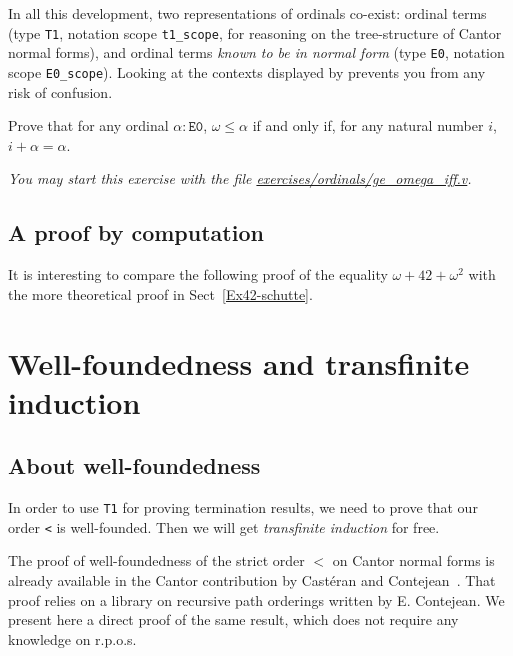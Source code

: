 \begin{remark}
In all this development, two representations of ordinals co-exist: ordinal terms (type \texttt{T1}, notation scope \texttt{t1\_scope}, for reasoning on the tree-structure of Cantor normal forms), and ordinal terms \emph{known to be in normal form} (type \texttt{E0}, notation scope \texttt{E0\_scope}). Looking at the contexts displayed by \coq{} prevents you from any risk of confusion.
\end{remark}

\begin{exercise}
Prove that for any ordinal $\alpha:\texttt{E0}$, 
$\omega\leq \alpha$ if and only if, for any natural number $i$,
$i+\alpha=\alpha$.

\emph{You may start this exercise with the file
    \href{https://github.com/coq-community/hydra-battles/tree/master/exercises/ordinals/ge_omega_iff.v}{exercises/ordinals/ge\_omega\_iff.v}.}
\end{exercise}

\subsection{A proof by computation}
\label{Ex42-E0}

It is interesting to compare the following proof of the equality
$\omega+42+\omega^2$ with the more theoretical proof in Sect~\vref{Ex42-schutte}.


\section{Well-foundedness and transfinite induction}


\subsection{About  well-foundedness}
\label{sec:T1Wf}
\label{sec:orgheadline82}
   In order to use \texttt{T1} for proving termination results,
we need to prove that  our order \texttt{<} is well-founded. Then we will get \emph{transfinite induction} for free.


The proof of well-foundedness of the strict order $<$ on Cantor normal forms is already 
available in the Cantor contribution by Castéran and Contejean~\cite{CantorContrib}. That proof relies on a library on recursive path orderings written by
E. Contejean. We present here  a direct proof of the same result, which does not require any knowledge on r.p.o.s.

